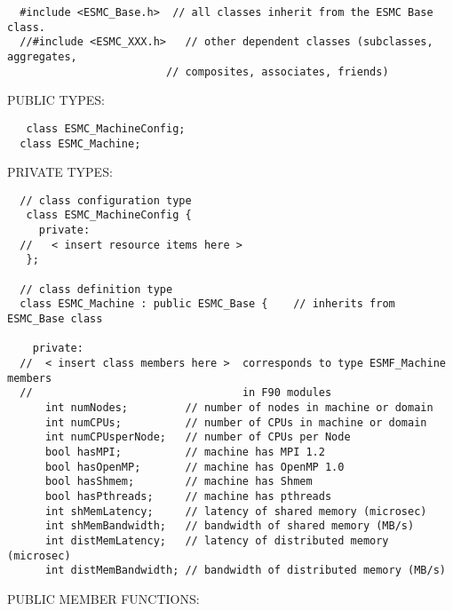 \begin{verbatim}  #include <ESMC_Base.h>  // all classes inherit from the ESMC Base class.
  //#include <ESMC_XXX.h>   // other dependent classes (subclasses, aggregates,
                         // composites, associates, friends)
 \end{verbatim}{\sf PUBLIC TYPES:}
\begin{verbatim}   class ESMC_MachineConfig;
  class ESMC_Machine;
 \end{verbatim}{\sf PRIVATE TYPES:}
\begin{verbatim} 
  // class configuration type
   class ESMC_MachineConfig {
     private:
  //   < insert resource items here >
   };
 
  // class definition type
  class ESMC_Machine : public ESMC_Base {    // inherits from ESMC_Base class
 
    private:
  //  < insert class members here >  corresponds to type ESMF_Machine members
  //                                 in F90 modules
      int numNodes;         // number of nodes in machine or domain
      int numCPUs;          // number of CPUs in machine or domain
      int numCPUsperNode;   // number of CPUs per Node
      bool hasMPI;          // machine has MPI 1.2
      bool hasOpenMP;       // machine has OpenMP 1.0
      bool hasShmem;        // machine has Shmem
      bool hasPthreads;     // machine has pthreads
      int shMemLatency;     // latency of shared memory (microsec)
      int shMemBandwidth;   // bandwidth of shared memory (MB/s)
      int distMemLatency;   // latency of distributed memory (microsec)
      int distMemBandwidth; // bandwidth of distributed memory (MB/s)
 \end{verbatim}{\sf PUBLIC MEMBER FUNCTIONS:}

